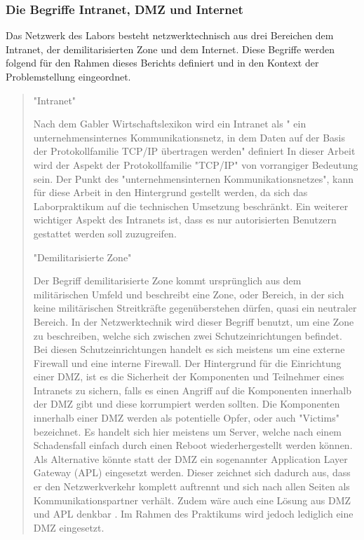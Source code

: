 \documentclass[
a4paper,     %
 headsepline, %
footsepline, %
titlepage,   %
 halfparskip,     %
 fleqn,       %
12pt         %
]{scrartcl}  %
\begin{document}
\subsubsection{Die Begriffe Intranet, DMZ und Internet}
Das Netzwerk des Labors besteht netzwerktechnisch aus drei Bereichen dem Intranet, der demilitarisierten Zone und dem Internet. 
Diese Begriffe werden folgend für den Rahmen dieses Berichts definiert und in den Kontext der Problemstellung eingeordnet.
\begin{quotation}
\item["Intranet"]

Nach dem Gabler Wirtschaftslexikon wird ein Intranet als " ein unternehmensinternes Kommunikationsnetz, in dem Daten auf der Basis der Protokollfamilie TCP/IP übertragen werden" definiert \cite{intra-1} In dieser Arbeit wird der Aspekt der Protokollfamilie "TCP/IP" von vorrangiger Bedeutung sein. Der Punkt des "unternehmensinternen Kommunikationsnetzes", kann für diese Arbeit in den Hintergrund gestellt werden, da sich das Laborpraktikum auf die technischen Umsetzung beschränkt. 
Ein weiterer wichtiger Aspekt des Intranets ist, dass es nur autorisierten Benutzern gestattet werden soll zuzugreifen.  

\item["Demilitarisierte Zone"]

Der Begriff demilitarisierte Zone kommt ursprünglich aus dem militärischen Umfeld und beschreibt eine Zone, oder Bereich, in der sich keine militärischen Streitkräfte gegenüberstehen dürfen, quasi ein neutraler Bereich. 
In der Netzwerktechnik wird dieser Begriff benutzt, um eine Zone zu beschreiben, welche sich zwischen zwei Schutzeinrichtungen befindet. Bei diesen Schutzeinrichtungen handelt es sich meistens um eine externe Firewall und eine interne Firewall. Der Hintergrund für die Einrichtung einer DMZ, ist es die Sicherheit der Komponenten und Teilnehmer eines Intranets zu sichern, falls es einen Angriff auf die Komponenten innerhalb der DMZ gibt und diese korrumpiert werden sollten. Die Komponenten innerhalb einer DMZ werden als potentielle Opfer, oder auch "Victims" bezeichnet. Es handelt sich hier meistens um Server, welche nach einem Schadensfall einfach durch einen Reboot wiederhergestellt werden können. 
Als Alternative könnte statt der DMZ ein sogenannter Application Layer Gateway (APL) eingesetzt werden. Dieser zeichnet sich dadurch aus, dass er den Netzwerkverkehr komplett auftrennt und sich nach allen Seiten als Kommunikationspartner verhält. Zudem wäre auch eine Lösung aus DMZ und APL denkbar \cite{intra1}. Im Rahmen des Praktikums wird jedoch lediglich eine DMZ eingesetzt.


\end{quotation}
\end{document}
